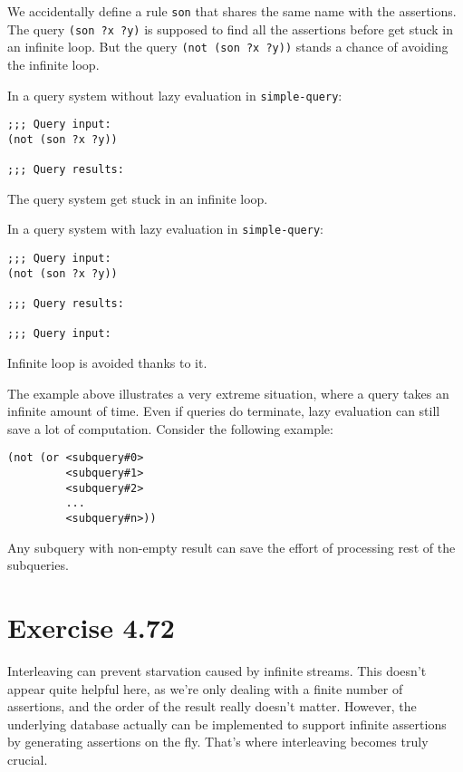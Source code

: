 \documentclass[../main.tex]{subfiles}
\begin{document}
We accidentally define a rule \lstinline{son} that shares the same name with the assertions. The query \lstinline{(son ?x ?y)} is supposed to find all the assertions before get stuck in an infinite loop. But the query \lstinline{(not (son ?x ?y))} stands a chance of avoiding the infinite loop.

In a query system without lazy evaluation in \lstinline{simple-query}:

\begin{lstlisting}
;;; Query input:
(not (son ?x ?y))

;;; Query results:
\end{lstlisting}

The query system get stuck in an infinite loop.

In a query system with lazy evaluation in \lstinline{simple-query}:

\begin{lstlisting}
;;; Query input:
(not (son ?x ?y))

;;; Query results:

;;; Query input:
\end{lstlisting}

Infinite loop is avoided thanks to it.

The example above illustrates a very extreme situation, where a query takes an infinite amount of time. Even if queries do terminate, lazy evaluation can still save a lot of computation. Consider the following example:

\begin{lstlisting}
(not (or <subquery#0>
         <subquery#1>
         <subquery#2>
         ...
         <subquery#n>))
\end{lstlisting}

Any subquery with non-empty result can save the effort of processing rest of the subqueries.

\section{Exercise 4.72}

Interleaving can prevent starvation caused by infinite streams. This doesn't appear quite helpful here, as we're only dealing with a finite number of assertions, and the order of the result really doesn't matter. However, the underlying database actually can be implemented to support infinite assertions by generating assertions on the fly. That's where interleaving becomes truly crucial.
\end{document}

